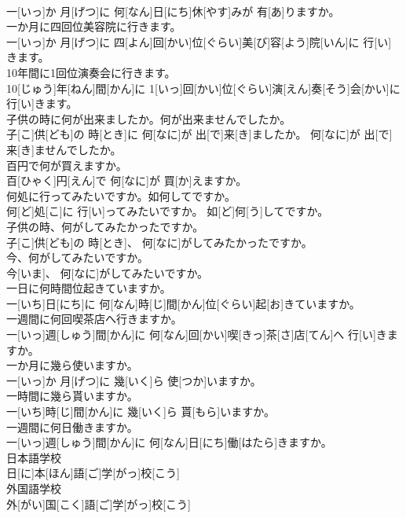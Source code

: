 \documentclass[8pt]{extreport}
\begin{document}
\begin{CJK}{UTF8}{min}
\\	一[いっ]か 月[げつ]に 何[なん]日[にち]休[やす]みが 有[あ]りますか。
\\	一か月に四回位美容院に行きます。	
\\	一[いっ]か 月[げつ]に 四[よん]回[かい]位[ぐらい]美[び]容[よう]院[いん]に 行[い]きます。
\\	10年間に1回位演奏会に行きます。	
\\	10[じゅう]年[ねん]間[かん]に 1[いっ]回[かい]位[ぐらい]演[えん]奏[そう]会[かい]に 行[い]きます。
\\	子供の時に何が出来ましたか。何が出来ませんでしたか。	
\\	子[こ]供[ども]の 時[とき]に 何[なに]が 出[で]来[き]ましたか。 何[なに]が 出[で]来[き]ませんでしたか。
\\	百円で何が買えますか。	
\\	百[ひゃく]円[えん]で 何[なに]が 買[か]えますか。
\\	何処に行ってみたいですか。如何してですか。	
\\	何[ど]処[こ]に 行[い]ってみたいですか。 如[ど]何[う]してですか。
\\	子供の時、何がしてみたかったですか。	
\\	子[こ]供[ども]の 時[とき]、 何[なに]がしてみたかったですか。
\\	今、何がしてみたいですか。	
\\	今[いま]、 何[なに]がしてみたいですか。
\\	一日に何時間位起きていますか。	
\\	一[いち]日[にち]に 何[なん]時[じ]間[かん]位[ぐらい]起[お]きていますか。
\\	一週間に何回喫茶店へ行きますか。	
\\	一[いっ]週[しゅう]間[かん]に 何[なん]回[かい]喫[きっ]茶[さ]店[てん]へ 行[い]きますか。
\\	一か月に幾ら使いますか。	
\\	一[いっ]か 月[げつ]に 幾[いく]ら 使[つか]いますか。
\\	一時間に幾ら貰いますか。	
\\	一[いち]時[じ]間[かん]に 幾[いく]ら 貰[もら]いますか。
\\	一週間に何日働きますか。	
\\	一[いっ]週[しゅう]間[かん]に 何[なん]日[にち]働[はたら]きますか。
\\	日本語学校	
\\	日[に]本[ほん]語[ご]学[がっ]校[こう]
\\	外国語学校	
\\	外[がい]国[こく]語[ご]学[がっ]校[こう]	

\end{CJK}
\end{document}
